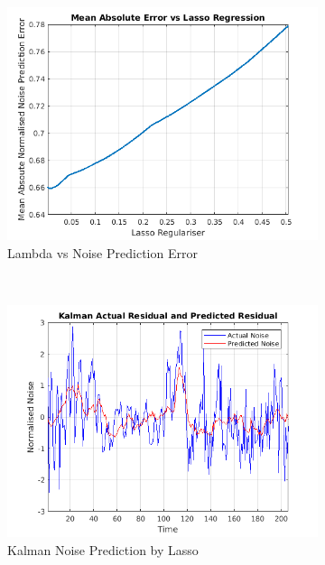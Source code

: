 \documentclass[11pt, fleqn]{article}
\begin{document}
\begin{figure}[!h]
    \centering
	\begin{subfigure}[b]{0.3\textwidth}
        \includegraphics[width=\textwidth]{error-vs-lambda.png}
	\caption{Lambda vs Noise Prediction Error}
	\label{fig:error-vs-lambda}
    \end{subfigure}
    ~ 
	\begin{subfigure}[b]{0.3\textwidth}
        \includegraphics[width=\textwidth]{noise-prediction.png}
	\caption{Kalman Noise Prediction by Lasso}
	\label{fig:noise-prediction}
    \end{subfigure}
 	~ 
	\begin{subfigure}[b]{0.3\textwidth}

\end{subfigure}
\end{figure}
\end{document}
